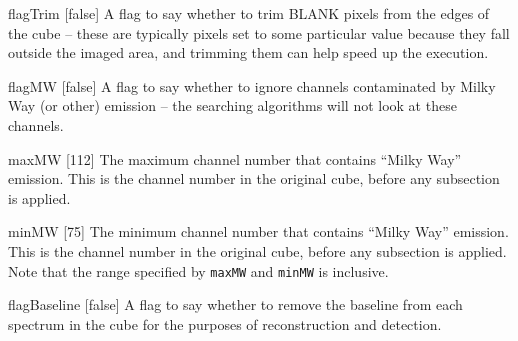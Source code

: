 \begin{Lentry}
\item[{flagTrim [false]}] A flag to say whether to trim
  BLANK pixels from the edges of the cube -- these are typically
  pixels set to some particular value because they fall outside the
  imaged area, and trimming them can help speed up the execution.
\item[{flagMW [false]}] A flag to say whether to ignore
  channels contaminated by Milky Way (or other) emission -- the
  searching algorithms will not look at these channels.
\item[{maxMW [112]}] The maximum channel number that contains
  ``Milky Way'' emission. This is the channel number in the original
  cube, before any subsection is applied.
\item[{minMW [75]}] The minimum channel number that contains ``Milky
  Way'' emission. This is the channel number in the original cube,
  before any subsection is applied.  Note that the range specified by
  \texttt{maxMW} and \texttt{minMW} is inclusive.
\item[{flagBaseline [false]}] A flag to say whether to remove
  the baseline from each spectrum in the cube for the purposes of
  reconstruction and detection.
\end{Lentry}


